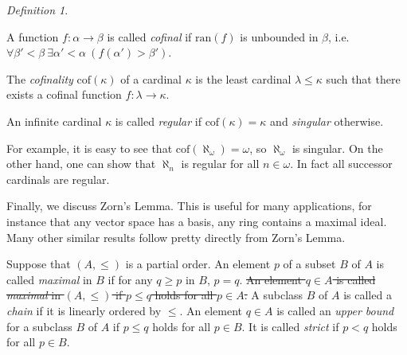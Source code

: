 \documentclass[a4paper, 11pt]{amsart}
\theoremstyle{remark}
\newtheorem{definition}[definition]{Definition}
\newcommand{\cof}{\mathrm{cof}}
\newcommand{\ran}{\mathrm{ran}}
\newenvironment{enumerate-(1)}{\begin{enumerate}[label={\upshape (\arabic*)}, leftmargin=2pc]}{\end{enumerate}}
\begin{document}
\begin{definition} \ 
\begin{enumerate-(1)} 
\item 
A function $f\colon \alpha\rightarrow \beta$ is called \emph{cofinal} if $\ran(f)$ is unbounded in $\beta$, i.e. $\forall \beta'<\beta\ \exists \alpha'<\alpha\ (f(\alpha')>\beta')$.  
\item 
The \emph{cofinality} $\cof(\kappa)$ of a cardinal $\kappa$ is the least cardinal $\lambda\leq\kappa$ such that there exists a cofinal function $f\colon \lambda \rightarrow \kappa$.  
\item 
An infinite cardinal $\kappa$ is called \emph{regular} if $\cof(\kappa)=\kappa$ and \emph{singular} otherwise. 
\end{enumerate-(1)} 
\end{definition} 


For example, it is easy to see that $\cof(\aleph_\omega)=\omega$, so $\aleph_\omega$ is singular. 
On the other hand, one can show that $\aleph_n$ is regular for all $n\in\omega$. 
In fact all successor cardinals are regular. 


Finally, we discuss Zorn's Lemma. This is useful for many applications, for instance that any vector space has a basis, any ring contains a maximal ideal. 
Many other similar results follow pretty directly from Zorn's Lemma. 


Suppose that $(A,\leq)$ is a partial order. 
{\color{blue} 
An element $p$ of a subset $B$ of $A$ is called \emph{maximal} in $B$ if for any $q\geq p$ in $B$, $p=q$. 
} 
\sout{An element $q\in A$ is called \emph{maximal} in $(A,\leq)$ if $p\leq q$ holds for all $p\in A$.} 
A subclass $B$ of $A$ is called a \emph{chain} if it is linearly ordered by $\leq$. 
An element $q\in A$ is called an \emph{upper bound} for a subclass $B$ of $A$ if $p\leq q$ holds for all $p\in B$. 
It is called \emph{strict} if $p< q$ holds for all $p\in B$. 
\end{document}
